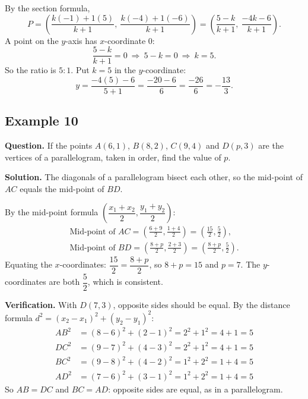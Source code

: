 By the section formula,
\[
P=\left(\frac{k(-1)+1(5)}{k+1},\ \frac{k(-4)+1(-6)}{k+1}\right)=\left(\frac{5-k}{k+1},\ \frac{-4k-6}{k+1}\right).
\]
A point on the $y$-axis has $x$-coordinate $0$:
\[
\frac{5-k}{k+1}=0\ \Rightarrow\ 5-k=0\ \Rightarrow\ k=5 .
\]
So the ratio is $5:1$. Put $k=5$ in the $y$-coordinate:
\[y=\frac{-4(5)-6}{5+1}=\frac{-20-6}{6}=\frac{-26}{6}=-\frac{13}{3}.\]


\subsection*{Example 10}
\textbf{Question.} If the points $A(6,1)$, $B(8,2)$, $C(9,4)$ and $D(p,3)$ are the vertices of a parallelogram, taken in order, find the value of $p$.

\textbf{Solution.} The diagonals of a parallelogram bisect each other, so the mid-point of $AC$ equals the mid-point of $BD$.

By the mid-point formula $\left(\dfrac{x_1+x_2}{2},\dfrac{y_1+y_2}{2}\right)$:
\[
\begin{gathered}
\text{Mid-point of }AC=\left(\frac{6+9}{2},\frac{1+4}{2}\right)=\left(\frac{15}{2},\frac52\right),\\
\text{Mid-point of }BD=\left(\frac{8+p}{2},\frac{2+3}{2}\right)=\left(\frac{8+p}{2},\frac52\right).
\end{gathered}
\]
Equating the $x$-coordinates: $\dfrac{15}{2}=\dfrac{8+p}{2}$, so $8+p=15$ and $p=7$.
The $y$-coordinates are both $\dfrac52$, which is consistent.

\textbf{Verification.} With $D(7,3)$, opposite sides should be equal. By the distance formula $d^2=(x_2-x_1)^2+(y_2-y_1)^2$:
\begin{align*}
AB^2&=(8-6)^2+(2-1)^2=2^2+1^2=4+1=5\\
DC^2&=(9-7)^2+(4-3)^2=2^2+1^2=4+1=5\\
BC^2&=(9-8)^2+(4-2)^2=1^2+2^2=1+4=5\\
AD^2&=(7-6)^2+(3-1)^2=1^2+2^2=1+4=5
\end{align*}
So $AB=DC$ and $BC=AD$: opposite sides are equal, as in a parallelogram.


